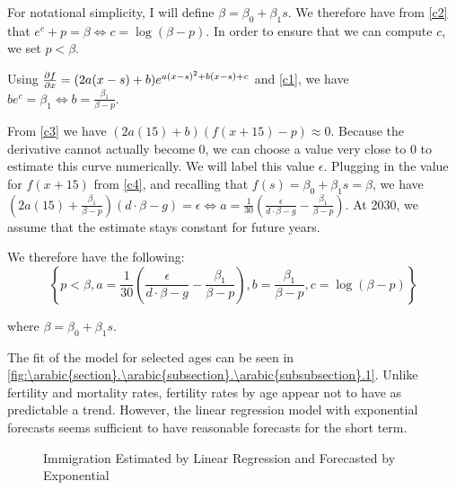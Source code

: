 \documentclass[10pt]{article}
\renewcommand{\thesection}{\arabic{section}}
\renewcommand{\thesubsection}{\thesection.\arabic{subsection}}
\renewcommand{\thesubsubsection}{\thesubsection.\arabic{subsubsection}}
\numberwithin{equation}{subsection}
\newcommand*{\FigureDir}{../../graphs}
\begin{document}
\par For notational simplicity, I will define \(\beta = \beta_0 + \beta_1s\). We therefore have from \ref{c2} that \(e^c + p = \beta \Leftrightarrow c = \log(\beta - p)\). In order to ensure that we can compute \(c\), we set \(p < \beta\).

\par Using \(\pdv{f}{x} = (2a(x-s) + b)e^{a(x-s)^2 + b(x-s) + c}\) and \ref{c1}, we have \(be^c = \beta_1 \Leftrightarrow b = \frac{\beta_1}{\beta - p}\).

\par From \ref{c3} we have \((2a(15) + b)(f(x+15) - p) \approx 0\). Because the derivative cannot actually become 0, we can choose a value very close to 0 to estimate this curve numerically. We will label this value \(\epsilon\). Plugging in the value for \(f(x+15)\) from \ref{c4}, and recalling that \(f(s) = \beta_0 + \beta_1s = \beta\), we have \(\left(2a(15) + \frac{\beta_1}{\beta - p}\right)(d\cdot \beta - g) = \epsilon \Leftrightarrow a = \frac{1}{30}\left(\frac{\epsilon}{d\cdot\beta-g} - \frac{\beta_1}{\beta - p}\right)\). At 2030, we assume that the estimate stays constant for future years.

\par We therefore have the following:
\[
   \left\{
      p < \beta,
      a = \frac{1}{30}\left(\frac{\epsilon}{d\cdot\beta - g} - \frac{\beta_1}{\beta - p}\right),
      b = \frac{\beta_1}{\beta - p},
      c = \log(\beta - p)
   \right\}
\]

\par where \(\beta = \beta_0 + \beta_1s\).

\par The fit of the model for selected ages can be seen in \autoref{fig:\thesubsubsection.1}. Unlike fertility and mortality rates, fertility rates by age appear not to have as predictable a trend. However, the linear regression model with exponential forecasts seems sufficient to have reasonable forecasts for the short term.

\begin{figure}[!ht]
   \centering
   \caption{\label{fig:\thesubsubsection.1}Immigration Estimated by Linear Regression and Forecasted by Exponential}
\end{figure}
\end{document}
